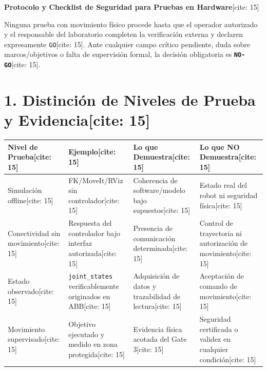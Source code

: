 \documentclass[11pt, a4paper]{article}
\begin{document}
\begin{center}
    \Large\textbf{\textcolor{red!80!black}{Protocolo y Checklist de Seguridad para Pruebas en Hardware}}[cite: 15]
\end{center}

\begin{tcolorbox}[colback=red!5, colframe=red!80!black, title=\textbf{Estado Inicial de la Sesión: NO-GO para Movimiento Físico} {[cite: 15]}, left=2mm, right=2mm, top=1mm, bottom=1mm]
    \small
    Ninguna prueba con movimiento físico procede hasta que el operador autorizado y el responsable del laboratorio completen la verificación externa y declaren expresamente \texttt{GO}[cite: 15]. Ante cualquier campo crítico pendiente, duda sobre marcos/objetivos o falta de supervisión formal, la decisión obligatoria es \textbf{\texttt{NO-GO}}[cite: 15].
\end{tcolorbox}

\section*{1. Distinción de Niveles de Prueba y Evidencia[cite: 15]}
\begin{center}
\footnotesize
\renewcommand{\arraystretch}{1.35}
\begin{tabularx}{\textwidth}{|>{\hsize=0.8\hsize\raggedright\arraybackslash}X|>{\hsize=0.9\hsize\raggedright\arraybackslash}X|>{\hsize=1.15\hsize\raggedright\arraybackslash}X|>{\hsize=1.15\hsize\raggedright\arraybackslash}X|}
\hline
\rowcolor{gray!20}
\textbf{Nivel de Prueba}[cite: 15] & \textbf{Ejemplo}[cite: 15] & \textbf{Lo que Demuestra}[cite: 15] & \textbf{Lo que NO Demuestra}[cite: 15] \\ \hline
Simulación offline[cite: 15] & FK/MoveIt/RViz sin controlador[cite: 15] & Coherencia de software/modelo bajo supuestos[cite: 15] & Estado real del robot ni seguridad física[cite: 15] \\ \hline
Conectividad sin movimiento[cite: 15] & Respuesta del controlador bajo interfaz autorizada[cite: 15] & Presencia de comunicación determinada[cite: 15] & Control de trayectoria ni autorización de movimiento[cite: 15] \\ \hline
Estado observado[cite: 15] & \texttt{joint\_states} verificablemente originados en ABB[cite: 15] & Adquisición de datos y trazabilidad de lectura[cite: 15] & Aceptación de comando de movimiento[cite: 15] \\ \hline
Movimiento supervisado[cite: 15] & Objetivo ejecutado y medido en zona protegida[cite: 15] & Evidencia física acotada del Gate 3[cite: 15] & Seguridad certificada o validez en cualquier condición[cite: 15] \\ \hline
\end{tabularx}
\end{center}
\end{document}

